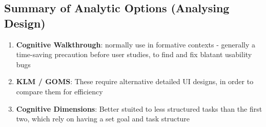 \documentclass{article}
\begin{document}
\subsection{Summary of Analytic Options (Analysing Design)}
\begin{enumerate}
    \item \textbf{Cognitive Walkthrough}: normally use in formative contexts - generally a time-saving precaution before user studies, to find and fix blatant usability bugs
    
    \item \textbf{KLM / GOMS}: These require alternative detailed UI designs, in order to compare them for efficiency
    
    \item \textbf{Cognitive Dimensions}: Better stuited to less structured tasks than the first two, which rely on having a set goal and task structure
\end{enumerate}
\end{document}
